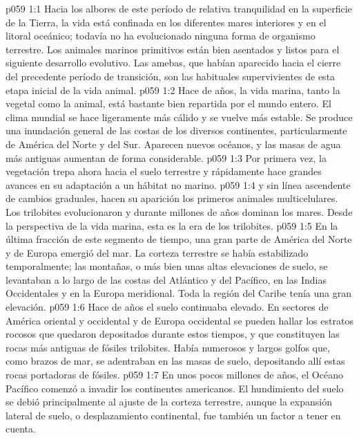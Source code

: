 \vs p059 1:1 Hacia los albores de este período de relativa tranquilidad en la superficie de la Tierra, la vida está confinada en los diferentes mares interiores y en el litoral oceánico; todavía no ha evolucionado ninguna forma de organismo terrestre. Los animales marinos primitivos están bien asentados y listos para el siguiente desarrollo evolutivo. Las amebas, que habían aparecido hacia el cierre del precedente período de transición, son las habituales supervivientes de esta etapa inicial de la vida animal.
\vs p059 1:2 \pc Hace  de años, la vida marina, tanto la vegetal como la animal, está bastante bien repartida por el mundo entero. El clima mundial se hace ligeramente más cálido y se vuelve más estable. Se produce una inundación general de las costas de los diversos continentes, particularmente de América del Norte y del Sur. Aparecen nuevos océanos, y las masas de agua más antiguas aumentan de forma considerable.
\vs p059 1:3 Por primera vez, la vegetación trepa ahora hacia el suelo terrestre y rápidamente hace grandes avances en su adaptación a un hábitat no marino.
\vs p059 1:4  y sin línea ascendente de cambios graduales, hacen su aparición los primeros animales multicelulares. Los trilobites evolucionaron y durante millones de años dominan los mares. Desde la perspectiva de la vida marina, esta es la era de los trilobites.
\vs p059 1:5 En la última fracción de este segmento de tiempo, una gran parte de América del Norte y de Europa emergió del mar. La corteza terrestre se había estabilizado temporalmente; las montañas, o más bien unas altas elevaciones de suelo, se levantaban a lo largo de las costas del Atlántico y del Pacífico, en las Indias Occidentales y en la Europa meridional. Toda la región del Caribe tenía una gran elevación.
\vs p059 1:6 \pc Hace  de años el suelo continuaba elevado. En sectores de América oriental y occidental y de Europa occidental se pueden hallar los estratos rocosos que quedaron depositados durante estos tiempos, y que constituyen las rocas más antiguas de fósiles trilobites. Había numerosos y largos golfos que, como brazos de mar, se adentraban en las masas de suelo, depositando allí estas rocas portadoras de fósiles.
\vs p059 1:7 En unos pocos millones de años, el Océano Pacífico comenzó a invadir los continentes americanos. El hundimiento del suelo se debió principalmente al ajuste de la corteza terrestre, aunque la expansión lateral de suelo, o desplazamiento continental, fue también un factor a tener en cuenta.
